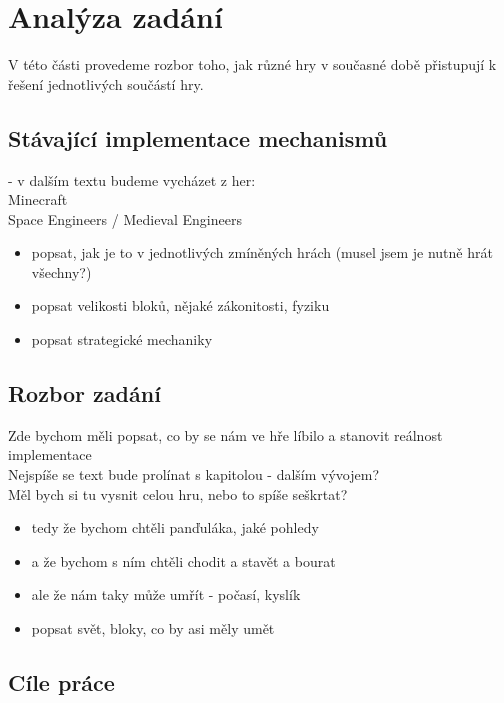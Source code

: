 
\chapter{Analýza zadání}

V této části provedeme rozbor toho, jak různé hry v současné době přistupují k řešení jednotlivých součástí hry. 

\section{Stávající implementace mechanismů}
- v dalším textu budeme vycházet z her: \\

Minecraft \\
Space Engineers / Medieval Engineers \\

\begin{itemize}
	\item popsat, jak je to v jednotlivých zmíněných hrách (musel jsem je nutně hrát všechny?)
	\item popsat velikosti bloků, nějaké zákonitosti, fyziku
	\item popsat strategické mechaniky
\end{itemize}

\section{Rozbor zadání}

Zde bychom měli popsat, co by se nám ve hře líbilo a stanovit reálnost implementace
\\

Nejspíše se text bude prolínat s kapitolou - dalším vývojem?\\
Měl bych si tu vysnit celou hru, nebo to spíše seškrtat?


\begin{itemize}
	\item tedy že bychom chtěli panďuláka, jaké pohledy
	\item a že bychom s ním chtěli chodit a stavět a bourat
	\item ale že nám taky může umřít - počasí, kyslík
	\item popsat svět, bloky, co by asi měly umět

\end{itemize}


\section{Cíle práce}